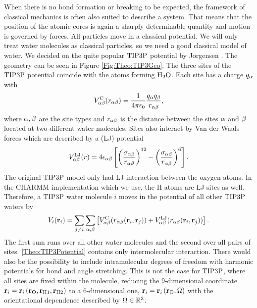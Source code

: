 \documentclass[8.5pt,twoside,twocolumn]{article}
\renewcommand\r{\bo r}
\theoremstyle{standard}
\begin{document}
When there is no bond formation or breaking to be expected, the framework of
classical mechanics is often also suited to describe a system. That means that
the position of the atomic cores is again a sharply determinable quantity
and motion is governed by forces. All particles move in a classical potential.
We will only treat water molecules as classical particles, so we need a good
classical model of water. We decided on the quite popular $\text{TIP3P}$ potential 
by Jorgensen \etal \cite{Jorgensen1983TIP3P}. The geometry can be
seen in Figure \ref{Fig:Theo:TIP3Geo}. The three sites of the $\text{TIP3P}$ potential
coincide with the atoms forming $\text H _2 \text O$. Each site has a charge $q_{\alpha}$ with 
\begin{equation}
V^{\text C}_{\alpha\beta}(r_{\alpha\beta})=\frac{1}{4\pi\epsilon_0}\frac{q_{\alpha}q_{\beta}}{r_{\alpha\beta}},
\label{Theo:TIP3EC}
\end{equation}
where $\alpha,\beta$ are the site types and $r_{\alpha\beta}$ is the distance between
the sites $\alpha$ and $\beta$ located at two different water molecules. Sites also
interact by Van-der-Waals forces which are described by a 
(LJ) potential \newcommand\ELJ{\enmat V^{\te{LJ}}_{\al\be}}
\newcommand\salbe{\enmat{\si_{\al\be}}}
\newcommand\ealbe{\enmat{\eps_{\al\be}}}
\begin{equation}
\ELJ(r)=4\ealbe\ed{\rb{\frac{\salbe}{\ralbe}}^{12}-\rb{\frac{\salbe}{\ralbe}}^{6}}.
\label{Theo:TIP3ELJ}
\end{equation}
The original $\text{TIP3P}$ model only had LJ interaction between the oxygen atoms. In
the CHARMM \cite{CHARMM2009} implementation which we use, the H atoms are LJ
sites as well.
Therefore, a $\text{TIP3P}$ water molecule $i$ moves in the potential of all other $\text{TIP3P}$ waters by
\begin{equation}
V_i(\r_i)=\sum_{j\neq i} \sum_{\al,\be} \ed{\EC(\ralbe(\r_i,\r_j)) + \ELJ(\ralbe(\r_i,\r_j))}.
\label{Theo:TIP3Potential}
\end{equation}
The first sum runs over all other water molecules and the second over all
pairs of sites. \eqref{Theo:TIP3Potential} contains only
intermolecular interaction. There would also be the possibility to include intramolecular degrees of freedom with
harmonic potentials for bond and angle stretching. This is not the case for $\text{TIP3P}$,
where all sites are fixed within the molecule, reducing the 9-dimensional coordinate
\mbox{$\r_i=\r_i\rb{\r_{\te O},\r_{\te H1},\r_{\te H2}}$} to a 6-dimensional one, \mbox{$\r_i=\r_i\rb{\r_{\te O},\Om}$}
with the orientational dependence described by $\Omega\in\mathbb{R}^3$.
\end{document}

